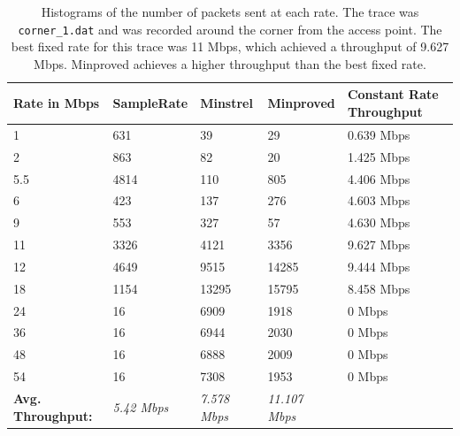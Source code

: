 \documentclass[letterpaper,twocolumn,10pt]{article}
\begin{document}
\begin{table}[htb]
    \centering
    \begin{tabular}{l|l|l|l|l}
    \textbf{Rate in Mbps}     & \textbf{SampleRate} & \textbf{Minstrel}   & \textbf{Minproved}   & \textbf{Constant Rate Throughput}\\ \hline
    1                & 631        & 39         & 29      & 0.639 Mbps    \\
    2                & 863        & 82         & 20      & 1.425 Mbps    \\
    5.5              & 4814       & 110        & 805     & 4.406 Mbps    \\
    6                & 423       & 137        & 276     & 4.603 Mbps    \\
    9                & 553         & 327        & 57      & 4.630 Mbps   \\
    11               & 3326       & 4121       & 3356    & 9.627 Mbps   \\
    12               & 4649       & 9515       & 14285   & 9.444 Mbps   \\
    18               & 1154         & 13295      & 15795   & 8.458 Mbps    \\
    24               & 16         & 6909       & 1918    & 0 Mbps   \\
    36               & 16         & 6944       & 2030    & 0 Mbps   \\
    48               & 16         & 6888       & 2009    & 0 Mbps   \\
    54               & 16         & 7308       & 1953    & 0 Mbps   \\ \hline
    \textbf{Avg. Throughput:} & \emph{5.42 Mbps}  & \emph{7.578 Mbps} & \emph{11.107 Mbps} \\
    \end{tabular}
    \caption{Histograms of the number of packets sent at each rate.
      The trace was \texttt{corner\_1.dat} and was recorded around the
      corner from the access point. The best fixed rate for this trace
      was 11 Mbps, which achieved a throughput of 9.627
      Mbps. Minproved achieves a higher throughput than the best fixed
      rate.}
\label{table:2}
\end{table}
\end{document}
